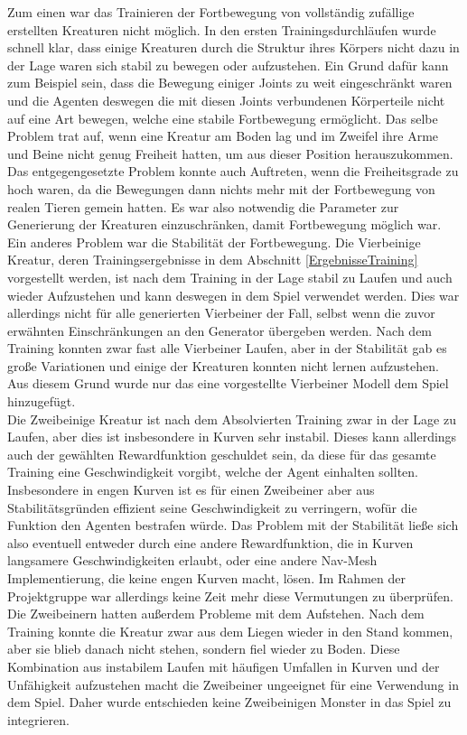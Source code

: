 Zum einen war das Trainieren der Fortbewegung von vollständig zufällige erstellten Kreaturen nicht möglich. 
In den ersten Trainingsdurchläufen wurde schnell klar, dass einige Kreaturen durch die Struktur ihres Körpers nicht dazu in der Lage waren sich stabil zu bewegen oder aufzustehen.
Ein Grund dafür kann zum Beispiel sein, dass die Bewegung einiger Joints zu weit eingeschränkt waren und die Agenten deswegen die mit diesen Joints verbundenen Körperteile nicht auf eine Art bewegen, welche eine stabile Fortbewegung ermöglicht. Das selbe Problem trat auf, wenn eine Kreatur am Boden lag und im Zweifel ihre Arme und Beine nicht genug Freiheit hatten, um aus dieser Position herauszukommen.
Das entgegengesetzte Problem konnte auch Auftreten, wenn die Freiheitsgrade zu hoch waren, da die Bewegungen dann nichts mehr mit der Fortbewegung von realen Tieren gemein hatten. Es war also notwendig die Parameter zur Generierung der Kreaturen einzuschränken, damit Fortbewegung möglich war.\\

Ein anderes Problem war die Stabilität der Fortbewegung. Die Vierbeinige Kreatur, deren Trainingsergebnisse in dem Abschnitt \ref{ErgebnisseTraining} vorgestellt werden, ist nach dem Training in der Lage stabil zu Laufen und auch wieder Aufzustehen und kann deswegen in dem Spiel verwendet werden. 
Dies war allerdings nicht für alle generierten Vierbeiner der Fall, selbst wenn die zuvor erwähnten Einschränkungen an den Generator übergeben werden. Nach dem Training konnten zwar fast alle Vierbeiner Laufen, aber in der Stabilität gab es große Variationen und einige der Kreaturen konnten nicht lernen aufzustehen. Aus diesem Grund wurde nur das eine vorgestellte Vierbeiner Modell dem Spiel hinzugefügt.\\
Die Zweibeinige Kreatur ist nach dem Absolvierten Training zwar in der Lage zu Laufen, aber dies ist insbesondere in Kurven sehr instabil. Dieses kann allerdings auch der gewählten Rewardfunktion geschuldet sein, da diese für das gesamte Training eine Geschwindigkeit vorgibt, welche der Agent einhalten sollten. Insbesondere in engen Kurven ist es für einen Zweibeiner aber aus Stabilitätsgründen effizient seine Geschwindigkeit zu verringern, wofür die Funktion den Agenten bestrafen würde. Das Problem mit der Stabilität ließe sich also eventuell entweder durch eine andere Rewardfunktion, die in Kurven langsamere Geschwindigkeiten erlaubt, oder eine andere Nav-Mesh Implementierung, die keine engen Kurven macht, lösen. Im Rahmen der Projektgruppe war allerdings keine Zeit mehr diese Vermutungen zu überprüfen.\\
Die Zweibeinern hatten außerdem Probleme mit dem Aufstehen. Nach dem Training konnte die Kreatur zwar aus dem Liegen wieder in den Stand kommen, aber sie blieb danach nicht stehen, sondern fiel wieder zu Boden. Diese Kombination aus instabilem Laufen mit häufigen Umfallen in Kurven und der Unfähigkeit aufzustehen macht die Zweibeiner ungeeignet für eine Verwendung in dem Spiel. Daher wurde entschieden keine Zweibeinigen Monster in das Spiel zu integrieren. \\

